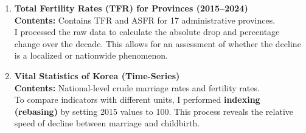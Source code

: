 \documentclass[12pt,letterpaper]{article}
\begin{document}
	\begin{enumerate}
		\item \textbf{Total Fertility Rates (TFR) for Provinces (2015--2024)} \\
		\textbf{Contents:} Contains TFR and ASFR for 17 administrative provinces. \\
		I processed the raw data to calculate the absolute drop and percentage change over the decade. This allows for an assessment of whether the decline is a localized or nationwide phenomenon.
		
		\begin{table}[H]
			\centering
			\caption{Descriptive Statistics: Provincial Fertility Change (2015--2024)}
			\label{tab:tfr_change_summary}
		\end{table}
		
		\item \textbf{Vital Statistics of Korea (Time-Series)} \\
		\textbf{Contents:} National-level crude marriage rates and fertility rates. \\
		To compare indicators with different units, I performed \textbf{indexing (rebasing)} by setting 2015 values to 100. This process reveals the relative speed of decline between marriage and childbirth.
		
		\begin{table}[H]
			\centering
			\caption{Descriptive Statistics: National Marriage and Fertility Time-Series}
			\label{tab:vital_summary}
		\end{table}
		

\end{enumerate}
\end{document}
